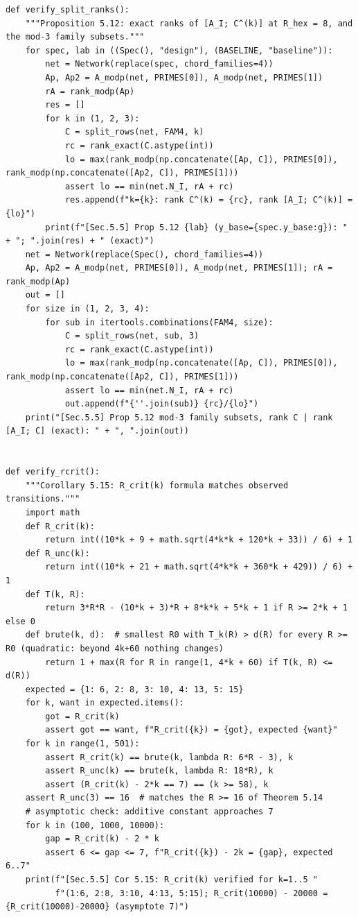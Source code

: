\documentclass[11pt,a4paper]{article}
\theoremstyle{definition}
\theoremstyle{remark}
\begin{document}
\begin{lstlisting}
def verify_split_ranks():
    """Proposition 5.12: exact ranks of [A_I; C^(k)] at R_hex = 8, and the mod-3 family subsets."""
    for spec, lab in ((Spec(), "design"), (BASELINE, "baseline")):
        net = Network(replace(spec, chord_families=4))
        Ap, Ap2 = A_modp(net, PRIMES[0]), A_modp(net, PRIMES[1])
        rA = rank_modp(Ap)
        res = []
        for k in (1, 2, 3):
            C = split_rows(net, FAM4, k)
            rc = rank_exact(C.astype(int))
            lo = max(rank_modp(np.concatenate([Ap, C]), PRIMES[0]), rank_modp(np.concatenate([Ap2, C]), PRIMES[1]))
            assert lo == min(net.N_I, rA + rc)
            res.append(f"k={k}: rank C^(k) = {rc}, rank [A_I; C^(k)] = {lo}")
        print(f"[Sec.5.5] Prop 5.12 {lab} (y_base={spec.y_base:g}): " + "; ".join(res) + " (exact)")
    net = Network(replace(Spec(), chord_families=4))
    Ap, Ap2 = A_modp(net, PRIMES[0]), A_modp(net, PRIMES[1]); rA = rank_modp(Ap)
    out = []
    for size in (1, 2, 3, 4):
        for sub in itertools.combinations(FAM4, size):
            C = split_rows(net, sub, 3)
            rc = rank_exact(C.astype(int))
            lo = max(rank_modp(np.concatenate([Ap, C]), PRIMES[0]), rank_modp(np.concatenate([Ap2, C]), PRIMES[1]))
            assert lo == min(net.N_I, rA + rc)
            out.append(f"{''.join(sub)} {rc}/{lo}")
    print("[Sec.5.5] Prop 5.12 mod-3 family subsets, rank C | rank [A_I; C] (exact): " + ", ".join(out))


def verify_rcrit():
    """Corollary 5.15: R_crit(k) formula matches observed transitions."""
    import math
    def R_crit(k):
        return int((10*k + 9 + math.sqrt(4*k*k + 120*k + 33)) / 6) + 1
    def R_unc(k):
        return int((10*k + 21 + math.sqrt(4*k*k + 360*k + 429)) / 6) + 1
    def T(k, R):
        return 3*R*R - (10*k + 3)*R + 8*k*k + 5*k + 1 if R >= 2*k + 1 else 0
    def brute(k, d):  # smallest R0 with T_k(R) > d(R) for every R >= R0 (quadratic: beyond 4k+60 nothing changes)
        return 1 + max(R for R in range(1, 4*k + 60) if T(k, R) <= d(R))
    expected = {1: 6, 2: 8, 3: 10, 4: 13, 5: 15}
    for k, want in expected.items():
        got = R_crit(k)
        assert got == want, f"R_crit({k}) = {got}, expected {want}"
    for k in range(1, 501):
        assert R_crit(k) == brute(k, lambda R: 6*R - 3), k
        assert R_unc(k) == brute(k, lambda R: 18*R), k
        assert (R_crit(k) - 2*k == 7) == (k >= 58), k
    assert R_unc(3) == 16  # matches the R >= 16 of Theorem 5.14
    # asymptotic check: additive constant approaches 7
    for k in (100, 1000, 10000):
        gap = R_crit(k) - 2 * k
        assert 6 <= gap <= 7, f"R_crit({k}) - 2k = {gap}, expected 6..7"
    print(f"[Sec.5.5] Cor 5.15: R_crit(k) verified for k=1..5 "
          f"(1:6, 2:8, 3:10, 4:13, 5:15); R_crit(10000) - 20000 = {R_crit(10000)-20000} (asymptote 7)")



\end{lstlisting}
\end{document}
